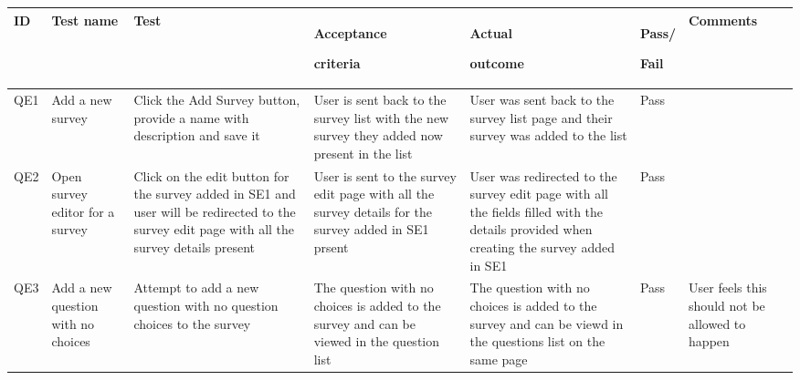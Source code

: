 \begin{longtable}{|p{}|p{}|p{}|p{}|p{}|p{}|p{}|}
  \hline
  ID  & Test name                          & Test                                                                                                                                          & Acceptance \par criteria                                                                                       & Actual \par outcome                                                                                                                                                     & Pass/\par Fail & Comments                                                                   \\
  \hline\hline                                                                                                                                                                                                                                                                              
  QE1 & Add a new survey                   & Click the Add Survey button, provide a name with description and save it                                                                      & User is sent back to the survey list with the new survey they added now present in the list                    & User was sent back to the survey list page and their survey was added to the list                                                                                       & Pass           &                                                                            \\ 
  \hline                                                                                            
  QE2 & Open survey editor for a survey    & Click on the edit button for the survey added in SE1 and user will be redirected to the survey edit page with all the survey details present  & User is sent to the survey edit page with all the survey details for the survey added in SE1 prsent            & User was redirected to the survey edit page with all the fields filled with the details provided when creating the survey added in SE1                                  & Pass           &                                                                            \\
  \hline        
  QE3 & Add a new question with no choices & Attempt to add a new question with no question choices to the survey                                                                          & The question with no choices is added to the survey and can be viewed in the question list                     & The question with no choices is added to the survey and can be viewd in the questions list on the same page                                                             & Pass           & User feels this should not be allowed to happen                            \\

\end{longtable}
